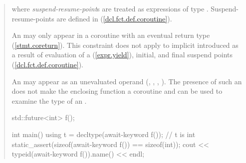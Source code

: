 \begin{quote}
%
%
%
%

where \textit{suspend-resume-point}s are treated as  expressions of type . Suspend-resume-points are defined in (\ref{dcl.fct.def.coroutine}).

\pnum
An  may only appear in a coroutine 
with an eventual return type (\ref{stmt.coreturn}). This constraint does not apply to implicit  introduced as a result of evaluation of a  (\ref{expr.yield}), initial, and final suspend points (\ref{dcl.fct.def.coroutine}).

\pnum
\enternote
An  may appear as an unevaluated operand (, , , ). The presence of such an  does not make the enclosing function a coroutine and can be used to examine the type of an .

\enterexample
\begin{codeblock}	
  std::future<int> f();
  
  int main() {
    using t = decltype(await-keyword f()); // t is int
    static_assert(sizeof(await-keyword f()) == sizeof(int));
    cout << typeid(await-keyword f()).name() << endl;
  }
\end{codeblock}
\exitexample%
\exitnote

\end{quote}
